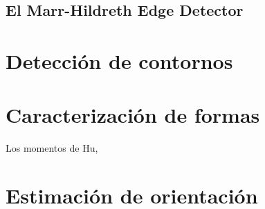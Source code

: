 \subsection{El Marr-Hildreth Edge Detector\\}
\section{Detección de contornos}

\section{Caracterización de formas}
Los momentos de Hu, 

\section{Estimación de orientación}